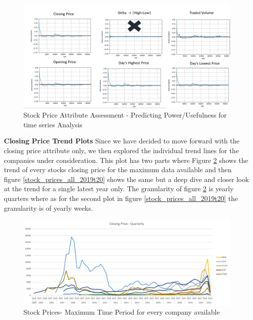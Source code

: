 \documentclass[sigconf, nonacm]{acmart}
\begin{document}
\begin{figure}[H]
  \centering
  \includegraphics[width=\linewidth]{images/autocorr.PNG}
  \caption{Stock Price Attribute Assessment - Predicting Power/Usefulness for time series Analysis}
  \label{Stock Price Attribute Assessment - Predicting Power/Usefulness for time series Analysis}
\end{figure}

\textbf{Closing Price Trend Plots}
Since we have decided to move forward with the closing price attribute only, we then explored the individual trend lines for the companies under consideration. This plot has two parts where Figure \ref{Stock Prices- Maximum Time Period for every company available} shows the trend of every stocks closing price for the maximum data available and then figure \ref{stock_prices_all_2019t20} shows the same but a deep dive and closer look at the trend for a single latest year only. The granularity of figure \ref{Stock Prices- Maximum Time Period for every company available} is yearly quarters where as for the second plot in figure \ref{stock_prices_all_2019t20} the granularity is of yearly weeks.

\begin{figure}[H]
  \centering
  \includegraphics[width=\linewidth]{images/allstocks.png}
  \caption{Stock Prices- Maximum Time Period for every company available}
  \label{Stock Prices- Maximum Time Period for every company available}
\end{figure}
\end{document}
